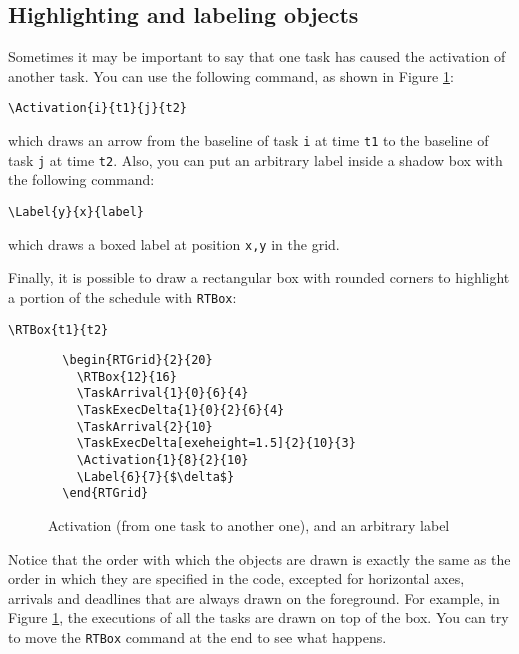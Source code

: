 \documentclass{article}
\begin{document}
\subsection{Highlighting and labeling objects}

Sometimes it may be important to say that one task has caused the
activation of another task. You can use the following command, as
shown in Figure \ref{fig:ex3a}:
\begin{verbatim}
\Activation{i}{t1}{j}{t2}
\end{verbatim}
which draws an arrow from the baseline of task \texttt{i} at time
\texttt{t1} to the baseline of task \texttt{j} at time \texttt{t2}.
Also, you can put an arbitrary label inside a shadow box with the
following command:
\begin{verbatim}
\Label{y}{x}{label}
\end{verbatim}
which draws a boxed label at position \texttt{x,y} in the grid.

Finally, it is possible to draw a rectangular box with rounded corners
to highlight a portion of the schedule with \texttt{RTBox}:
\begin{verbatim}
\RTBox{t1}{t2}
\end{verbatim}

\begin{figure}[!htbp]
  \centering
  \begin{RTGrid}{2}{20}
  \end{RTGrid}
\begin{verbatim}
  \begin{RTGrid}{2}{20}
    \RTBox{12}{16}
    \TaskArrival{1}{0}{6}{4}
    \TaskExecDelta{1}{0}{2}{6}{4}
    \TaskArrival{2}{10}
    \TaskExecDelta[exeheight=1.5]{2}{10}{3}
    \Activation{1}{8}{2}{10}
    \Label{6}{7}{$\delta$}
  \end{RTGrid}
\end{verbatim}
  \caption{Activation (from one task to another one), and an arbitrary label}
  \label{fig:ex3a}
\end{figure}

Notice that the order with which the objects are drawn is exactly the
same as the order in which they are specified in the code, excepted 
for horizontal axes, arrivals and deadlines that are always drawn on the foreground.
 For example, in Figure \ref{fig:ex3a}, the executions of all the tasks are
drawn on top of the box. You can try to move the \texttt{RTBox}
command at the end to see what happens.
\end{document}

